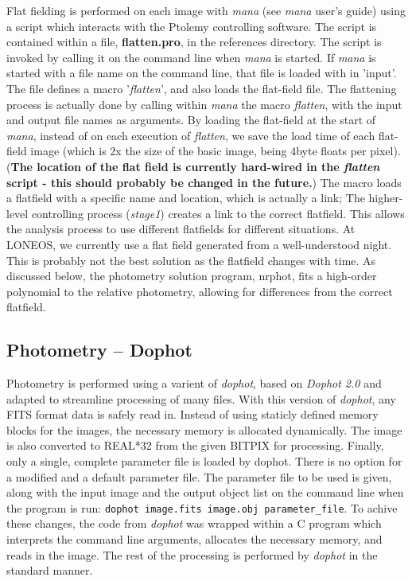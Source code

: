 \documentclass{article}
\newcommand{\note}[1]{({\bf #1})}
\newcommand\pr{\em}                   %
\newcommand\ff{\bf}                   %
\newcommand\cc{\tt}                   %
\begin{document}
Flat fielding is performed on each image with {\pr mana} (see {\pr
mana} user's guide) using a script which interacts with the Ptolemy
controlling software.  The script is contained within a file, {\ff
flatten.pro}, in the references directory.  The script is invoked by
calling it on the command line when {\pr mana} is started.  If {\pr
mana} is started with a file name on the command line, that file is
loaded with in 'input'.  The file defines a macro '{\pr flatten}', and
also loads the flat-field file.  The flattening process is actually
done by calling within {\pr mana} the macro {\pr flatten}, with the
input and output file names as arguments.  By loading the flat-field
at the start of {\pr mana}, instead of on each execution of {\pr
flatten}, we save the load time of each flat-field image (which is 2x
the size of the basic image, being 4byte floats per pixel).  \note{The
location of the flat field is currently hard-wired in the {\pr
flatten} script - this should probably be changed in the future.}  The
macro loads a flatfield with a specific name and location, which is
actually a link; The higher-level controlling process ({\pr stage1})
creates a link to the correct flatfield.  This allows the analysis
process to use different flatfields for different situations.  At
LONEOS, we currently use a flat field generated from a well-understood
night.  This is probably not the best solution as the flatfield
changes with time.  As discussed below, the photometry solution
program, nrphot, fits a high-order polynomial to the relative
photometry, allowing for differences from the correct flatfield.
 
\subsection{Photometry -- Dophot}

Photometry is performed using a varient of {\pr dophot}, based on {\pr
Dophot 2.0} and adapted to streamline processing of many files.  With
this version of {\pr dophot}, any FITS format data is safely read in.
Instead of using staticly defined memory blocks for the images, the
necessary memory is allocated dynamically.  The image is also
converted to REAL*32 from the given BITPIX for processing.  Finally,
only a single, complete parameter file is loaded by dophot.  There is
no option for a modified and a default parameter file.  The parameter
file to be used is given, along with the input image and the output
object list on the command line when the program is run: {\cc dophot
image.fits image.obj parameter\_file}. To achive these changes, the
code from {\pr dophot} was wrapped within a C program which interprets
the command line arguments, allocates the necessary memory, and reads
in the image.  The rest of the processing is performed by {\pr dophot} in
the standard manner.  
\end{document}
